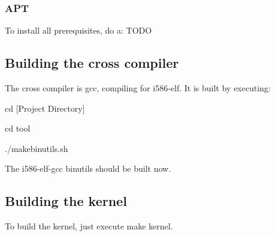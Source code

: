 \documentclass[12pt]{article}
\begin{document}
\subsubsection{APT}
To install all prerequisites, do a:
TODO
\subsection{Building the cross compiler}
The cross compiler is gcc, compiling for i586-elf. It is built by executing:

cd [Project Directory]

cd tool

./makebinutils.sh

\noindent The i586-elf-gcc binutils should be built now.
\subsection{Building the kernel}
To build the kernel, just execute make kernel.
\end{document}
